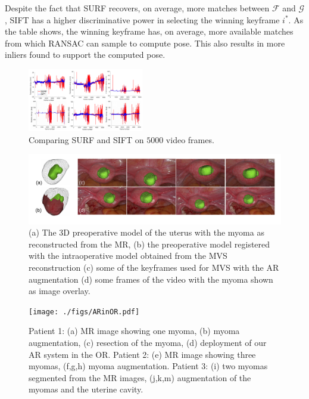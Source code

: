 Despite the fact that SURF recovers, on average, more matches between $\mathcal{F}$ and $\mathcal{G}$, SIFT has a higher discriminative power in selecting the winning keyframe $i^*$.
As the table shows, the winning keyframe has, on average, more available matches from which RANSAC can sample to compute pose.
This also results in more inliers found to support the computed pose.
\begin{figure}[t]
  \centering
  \includegraphics[width=0.45\textwidth]{./figs/Stability_Features2.pdf}
\caption{Comparing SURF and SIFT on $5000$ video frames.}
\label{fig:SurfVsSift}
\vspace{-5mm}
\end{figure}

\begin{figure}[ht]
  \centering
  \includegraphics[width=0.99\columnwidth]{./figs/frames_aug_new.pdf}
\caption{(a) The 3D preoperative model of the uterus with the  myoma as reconstructed from the MR, (b) the preoperative model registered with the intraoperative model obtained from the MVS reconstruction (c) some of the keyframes used for MVS with the AR augmentation  (d) some frames of the video with the myoma shown as image overlay.}
\label{fig:myomas}
\vspace{-5mm}
\end{figure}
\begin{figure}[ht]
  \centering
  \texttt{[image: ./figs/ARinOR.pdf]}
\caption{Patient 1: (a) MR image showing one myoma, (b) myoma augmentation, (c) resection of the myoma, (d) deployment of our AR system in the OR. Patient 2: (e) MR image showing three myomas, (f,g,h) myoma augmentation. Patient 3: (i) two myomas segmented from the MR images, (j,k,m) augmentation of the myomas and the uterine cavity.}
\label{fig:realOR}
\end{figure}

